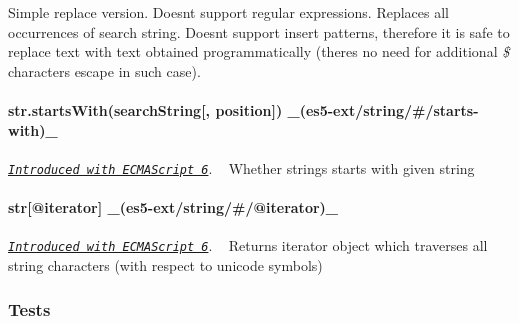 Simple {\ttfamily replace} version. Doesn\textquotesingle{}t support regular expressions. Replaces all occurrences of search string. Doesn\textquotesingle{}t support insert patterns, therefore it is safe to replace text with text obtained programmatically (there\textquotesingle{}s no need for additional {\itshape \$} characters escape in such case).

\paragraph*{str.\+starts\+With(search\+String\mbox{[}, position\mbox{]}) \+\_\+(es5-\/ext/string/\#/starts-\/with)\+\_\+}

\href{http://people.mozilla.org/~jorendorff/es6-draft.html#sec-string.prototype.startswith}{\tt {\itshape Introduced with E\+C\+M\+A\+Script 6}}. ~\newline
Whether strings starts with given string

\paragraph*{str\mbox{[}@iterator\mbox{]} \+\_\+(es5-\/ext/string/\#/@iterator)\+\_\+}

\href{http://people.mozilla.org/~jorendorff/es6-draft.html#sec-string.prototype-@@iterator}{\tt {\itshape Introduced with E\+C\+M\+A\+Script 6}}. ~\newline
Returns iterator object which traverses all string characters (with respect to unicode symbols)

\subsubsection*{Tests \href{https://travis-ci.org/medikoo/es5-ext}{\tt }}

 
